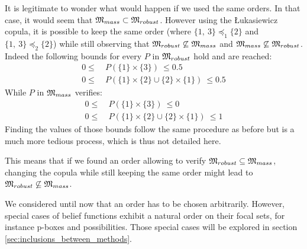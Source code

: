 \begin{example}
\begin{remark}
        It is legitimate to wonder what would happen if we used the same orders. In that case, it would seem that ${\mathfrak{M}}_{mass}\subset{\mathfrak{M}}_{robust}$. However using the \L ukasiewicz copula, it is possible to keep the same order (where $\{1,~3\} \preceq_1 \{2\}$ and $\{1,~3\} \preceq_2 \{2\}$) while still observing that ${\mathfrak{M}}_{robust}\not\subseteq {\mathfrak{M}}_{mass}$ and ${\mathfrak{M}}_{mass}\not\subseteq {\mathfrak{M}}_{robust}$. Indeed the following bounds for every $P$ in ${\mathfrak{M}}_{robust}$ hold and are reached:
        \begin{align*}
            0 \leqslant ~&P(\{1\}\times\{3\})~ \leqslant 0.5\\
            0 \leqslant ~&P(\{1\}\times\{2\}\cup\{2\}\times\{1\})~ \leqslant 0.5
        \end{align*}
        While $P$ in ${\mathfrak{M}}_{mass}$ verifies:
        \begin{align*}
            0 \leqslant ~&P(\{1\}\times\{3\})~ \leqslant 0\\
            0 \leqslant ~&P(\{1\}\times\{2\}\cup\{2\}\times\{1\})~ \leqslant 1
        \end{align*}
        Finding the values of those bounds follow the same procedure as before but is a much more tedious process, which is thus not detailed here. 
        
        This means that if we found an order allowing to verify ${\mathfrak{M}}_{robust}\subseteq {\mathfrak{M}}_{mass}$, changing the copula while still keeping the same order might lead to ${\mathfrak{M}}_{robust}\not\subseteq {\mathfrak{M}}_{mass}$.
    \end{remark}
\end{example}

We considered until now that an order has to be chosen arbitrarily. However, special cases of belief functions exhibit a natural order on their focal sets, for instance p-boxes and possibilities. Those special cases will be explored in section \ref{sec:inclusions_between_methods}.


